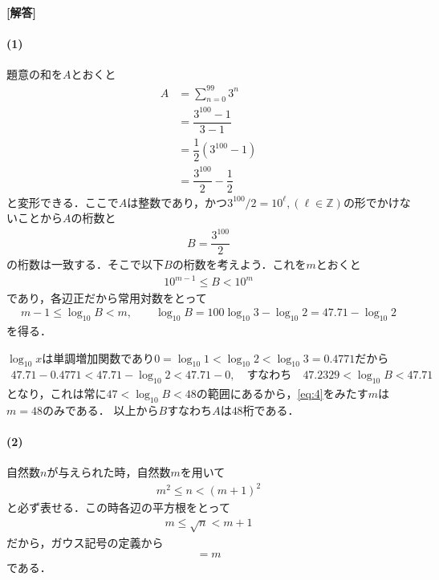 \documentclass[../../main.tex]{subfiles}
\begin{document}
\begin{oframed}
  
\end{oframed}

{\bf [解答]}
\paragraph{(1)}

題意の和を$A$とおくと
\begin{align}
  A
  &=\sum_{n=0}^{99}3^n \\
  &=\dfrac{3^{100}-1}{3-1} \\
  &=\dfrac{1}{2}(3^{100}-1) \\
  &=\dfrac{3^{100}}{2}-\dfrac{1}{2} \label{eq:1}
\end{align}
と変形できる．ここで$A$は整数であり，かつ$3^{100}/2=10^{\ell}, (\ell\in\mathbb{Z})$の形でかけないことから$A$の桁数と
\begin{align}
  B=\dfrac{3^{100}}{2} \label{eq:2}
\end{align}
の桁数は一致する．そこで以下$B$の桁数を考えよう．これを$m$とおくと
\begin{align}
  10^{m-1}\le B<10^m \label{eq:3}
\end{align}
であり，各辺正だから常用対数をとって
\begin{align}
  m-1\le\log_{10}B<m,\qquad\log_{10}B=100\log_{10}3-\log_{10}2=47.71-\log_{10}2 \label{eq:4}
\end{align}
を得る．

$\log_{10}x$は単調増加関数であり$0=\log_{10}1<\log_{10}2<\log_{10}3=0.4771$だから
\begin{align}
  47.71-0.4771<47.71-\log_{10}2<47.71-0,\quad\text{すなわち}\quad47.2329<\log_{10}B<47.71
\end{align}
となり，これは常に$47<\log_{10}B<48$の範囲にあるから，\cref{eq:4}をみたす$m$は$m=48$のみである．
以上から$B$すなわち$A$は$48$桁である．

\paragraph{(2)}

自然数$n$が与えられた時，自然数$m$を用いて
\begin{align}
  m^2\le n<(m+1)^2 \label{eq:5}
\end{align}
と必ず表せる．この時各辺の平方根をとって
\begin{align}
  m\le\sqrt{n}<m+1
\end{align}
だから，ガウス記号の定義から
\begin{align}
  [\sqrt{n}]=m \label{eq:6}
\end{align}
である．
\end{document}
